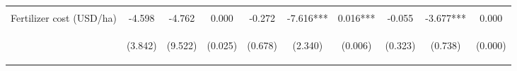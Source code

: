 \begin{center}
\begin{tabular}{lccccccccc}
\vspace{4pt} & \begin{footnotesize}[0.519]\end{footnotesize} & \begin{footnotesize}[0.146]\end{footnotesize} & \begin{footnotesize}[0.000]\end{footnotesize} & \begin{footnotesize}[0.603]\end{footnotesize} & \begin{footnotesize}[0.891]\end{footnotesize} & \begin{footnotesize}[0.712]\end{footnotesize} & \begin{footnotesize}[0.616]\end{footnotesize} & \begin{footnotesize}[0.000]\end{footnotesize} & \begin{footnotesize}[0.001]\end{footnotesize} \\
Fertilizer cost (USD/ha) & -4.598 & -4.762 & 0.000 & -0.272 & -7.616*** & 0.016*** & -0.055 & -3.677*** & 0.000 \\
 & \begin{footnotesize}(3.842)\end{footnotesize} & \begin{footnotesize}(9.522)\end{footnotesize} & \begin{footnotesize}(0.025)\end{footnotesize} & \begin{footnotesize}(0.678)\end{footnotesize} & \begin{footnotesize}(2.340)\end{footnotesize} & \begin{footnotesize}(0.006)\end{footnotesize} & \begin{footnotesize}(0.323)\end{footnotesize} & \begin{footnotesize}(0.738)\end{footnotesize} & \begin{footnotesize}(0.000)\end{footnotesize} \\

\end{tabular}
\end{center}
